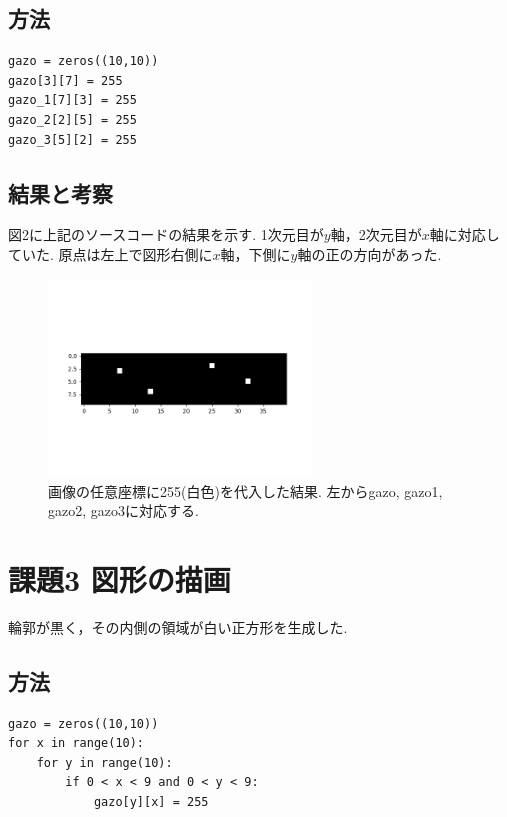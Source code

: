\documentclass[twocolumn, 10pt,a4j]{jsarticle}
\begin{document}
    \subsection{方法}
\begin{lstlisting}[caption=kadai2.py, label=p4_txt]
gazo = zeros((10,10))
gazo[3][7] = 255
gazo_1[7][3] = 255
gazo_2[2][5] = 255
gazo_3[5][2] = 255
\end{lstlisting}
        
    \subsection{結果と考察}
    図2に上記のソースコードの結果を示す. 1次元目が$y$軸，2次元目が$x$軸に対応していた. 原点は左上で図形右側に$x軸$，下側に$y$軸の正の方向があった.
    \begin{figure}[H]
    \begin{center}
        \includegraphics[width=7cm]{../img/kadai_2.png}
        \caption{画像の任意座標に255(白色)を代入した結果. 左からgazo, gazo1, gazo2, gazo3に対応する.}
    \end{center}
    \end{figure}

\section{課題3 図形の描画}
輪郭が黒く，その内側の領域が白い正方形を生成した.

    \subsection{方法}


\begin{lstlisting}[caption=kadai3.py, label=p4_txt]
gazo = zeros((10,10))
for x in range(10):
    for y in range(10):
        if 0 < x < 9 and 0 < y < 9:
            gazo[y][x] = 255
\end{lstlisting}
        
\end{document}
